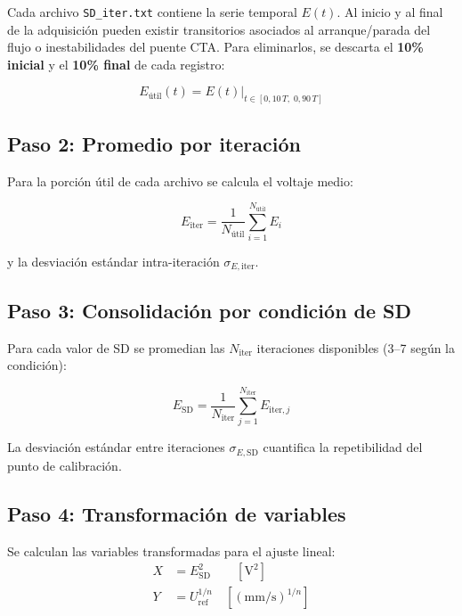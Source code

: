 \documentclass[12pt,a4paper]{article}
\begin{document}
Cada archivo \texttt{SD\_iter.txt} contiene la serie temporal $E(t)$.
Al inicio y al final de la adquisición pueden existir transitorios
asociados al arranque/parada del flujo o inestabilidades del puente CTA.
Para eliminarlos, se descarta el \textbf{10\% inicial} y el
\textbf{10\% final} de cada registro:

\begin{equation}
	E_\mathrm{útil}(t) = E(t)\bigg|_{t \in [0{,}10\,T,\; 0{,}90\,T]}
	\label{eq:descarte}
\end{equation}

\subsection{Paso 2: Promedio por iteración}

Para la porción útil de cada archivo se calcula el voltaje medio:

\begin{equation}
	E_\mathrm{iter} = \frac{1}{N_\mathrm{útil}}
	\sum_{i=1}^{N_\mathrm{útil}} E_i
	\label{eq:E_iter}
\end{equation}

y la desviación estándar intra-iteración $\sigma_{E,\mathrm{iter}}$.

\subsection{Paso 3: Consolidación por condición de SD}

Para cada valor de SD se promedian las $N_\mathrm{iter}$ iteraciones
disponibles (3--7 según la condición):

\begin{equation}
	E_\mathrm{SD} = \frac{1}{N_\mathrm{iter}}\sum_{j=1}^{N_\mathrm{iter}}
	E_{\mathrm{iter},j}
	\label{eq:E_SD}
\end{equation}

La desviación estándar entre iteraciones $\sigma_{E,\mathrm{SD}}$
cuantifica la repetibilidad del punto de calibración.

\subsection{Paso 4: Transformación de variables}

Se calculan las variables transformadas para el ajuste lineal:
\begin{align}
	X & = E_\mathrm{SD}^2 \qquad [\si{\volt\squared}]
	\label{eq:X_king}                                      \\
	Y & = U_\mathrm{ref}^{1/n} \quad [(\text{mm/s})^{1/n}]
	\label{eq:Y_king}
\end{align}
\end{document}
